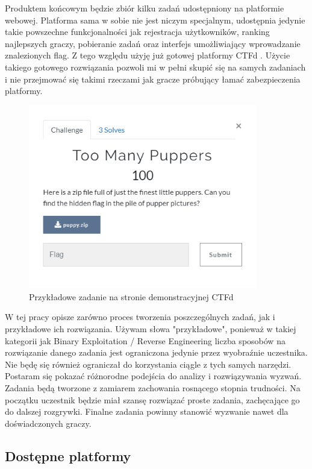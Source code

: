 \documentclass[polish,12pt]{aghthesis}
\begin{document}
Produktem końcowym będzie zbiór kilku zadań udostępniony na platformie webowej.
Platforma sama w sobie nie jest niczym specjalnym, udostępnia jedynie takie powszechne
funkcjonalności jak rejestracja użytkowników, ranking najlepszych graczy,
pobieranie zadań oraz interfejs umożliwiający wprowadzanie znalezionych
flag. Z tego względu użyję już gotowej platformy CTFd \cite{CTFd}.
Użycie takiego gotowego rozwiązania pozwoli mi w pełni skupić się na samych zadaniach
i nie przejmować się takimi rzeczami jak gracze próbujący łamać zabezpieczenia
platformy.

\begin{figure}[ht]
    \centering
    \includegraphics[width=10cm]{ctfd}
    \caption{Przykładowe zadanie na stronie demonstracyjnej CTFd}
    \label{fig:ctfd}
\end{figure}

W tej pracy opisze zarówno proces tworzenia poszczególnych zadań,
jak i przykładowe ich rozwiązania. Używam słowa "przykładowe", ponieważ
w takiej kategorii jak Binary Exploitation / Reverse Engineering liczba sposobów
na rozwiązanie danego zadania jest ograniczona jedynie przez wyobraźnie uczestnika.
Nie będę się również ograniczał do korzystania ciągle z tych samych narzędzi.
Postaram się pokazać różnorodne podejścia do analizy i rozwiązywania wyzwań.
Zadania będą tworzone z zamiarem zachowania rosnącego stopnia trudności.
Na początku uczestnik będzie miał szansę rozwiązać proste zadania,
zachęcające go do dalszej rozgrywki. Finalne zadania powinny stanowić wyzwanie
nawet dla doświadczonych graczy. \pagebreak

\subsection{Dostępne platformy}
\end{document}
